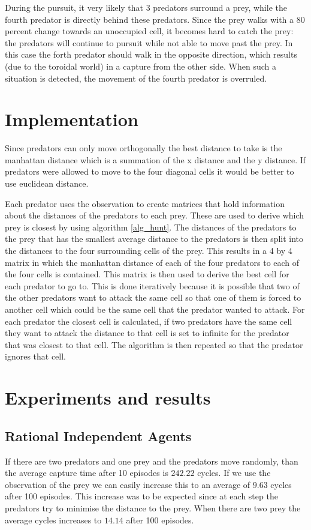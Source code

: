 \documentclass[10pt]{article}
\begin{document}
During the pursuit, it very likely that 3 predators surround a prey, while the fourth predator is directly behind these predators. Since the prey walks with a 80 percent change towards an unoccupied cell, it becomes hard to catch the prey: the predators will continue to pursuit while not able to move past the prey. In this case the forth predator should walk in the opposite direction, which results (due to the toroidal world) in a capture from the other side. When such a situation is detected, the movement of the fourth predator is overruled.


\section{Implementation}\label{implementation}
Since predators can only move orthogonally the best distance to take is the manhattan distance which is a summation of the x distance and the y distance. If predators were allowed to move to the four diagonal cells it would be better to use euclidean distance. 

Each predator uses the observation to create matrices that hold information about the distances of the predators to each prey. These are used to derive which prey is closest by using algorithm \ref{alg_hunt}. The distances of the predators to the prey that has the smallest average distance to the predators is then split into the distances to the four surrounding cells of the prey. This results in a 4 by 4 matrix in which the manhattan distance of each of the four predators to each of the four cells is contained. This matrix is then used to derive the best cell for each predator to go to. This is done iteratively because it is possible that two of the other predators want to attack the same cell so that one of them is forced to another cell which could be the same cell that the predator wanted to attack. For each predator the closest cell is calculated, if two predators have the same cell they want to attack the distance to that cell is set to infinite for the predator that was closest to that cell. The algorithm is then repeated so that the predator ignores that cell.

\section{Experiments and results}\label{experiments}
\subsection{Rational Independent Agents}
If there are two predators and one prey and the predators move randomly, than the average capture time after 10 episodes is $242.22$ cycles. If we use the observation of the prey we can easily increase this to an average of $9.63$ cycles after 100 episodes. This increase was to be expected since at each step the predators try to minimise the distance to the prey. When there are two prey the average cycles increases to $14.14$ after 100 episodes. 
\end{document}
